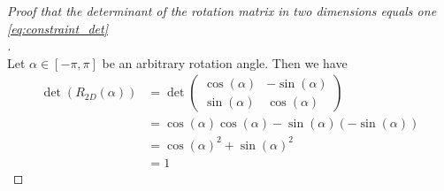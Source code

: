
\label{appendix}

\begin{proof}[Proof that the determinant of the rotation matrix in two dimensions equals one \eqref{eq:constraint_det}\\]$\,$\\
	Let $\alpha \in [-\pi, \pi]$ be an arbitrary rotation angle. Then we have
	\begin{equation}
		\label{proof:det_one}
		\begin{aligned}
		 \det (R_{2D}(\alpha)) &= \det \begin{pmatrix} \cos(\alpha) & -\sin(\alpha) \\\sin(\alpha) & \cos(\alpha) \end{pmatrix} \\
		&= \cos(\alpha)\cos(\alpha) - \sin(\alpha)(- \sin(\alpha))\\
		&= \cos(\alpha)^2 + \sin(\alpha)^2\\
		&= 1
		\end{aligned}
	\end{equation}
\end{proof}


